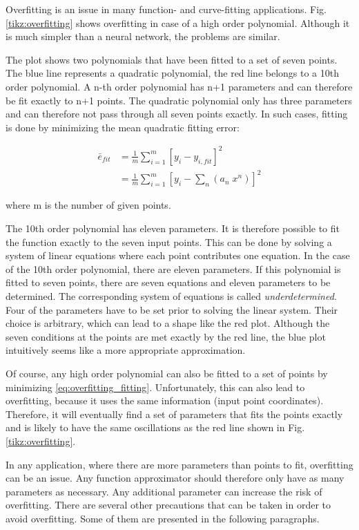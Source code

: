 Overfitting is an issue in many function- and curve-fitting applications. Fig. \ref{tikz:overfitting} shows overfitting in case of a high order polynomial. Although it is much simpler than a neural network, the problems are similar.

The plot shows two polynomials that have been fitted to a set of seven points. The blue line represents a quadratic polynomial, the red line belongs to a 10th order polynomial. A n-th order polynomial has n+1 parameters and can therefore be fit exactly to n+1 points. The quadratic polynomial only has three parameters and can therefore not pass through all seven points exactly. In such cases, fitting is done by minimizing the mean quadratic fitting error: 

\begin{align}
\bar{e}_{fit}&=\frac{1}{m}\sum_{i=1}^{m}[y_i-y_{i,fit}]^2 \\
&=\frac{1}{m}\sum_{i=1}^{m}[y_i-\sum_n (a_n\;x^n)]^2
\label{eq:overfitting_fitting}
\end{align}

where m is the number of given points. 

The 10th order polynomial has eleven parameters. It is therefore possible to fit the function exactly to the seven input points. This can be done by solving a system of linear equations where each point contributes one equation. In the case of the 10th order polynomial, there are eleven parameters. If this polynomial is fitted to seven points, there are seven equations and eleven parameters to be determined. The corresponding system of equations is called \textit{underdetermined}. Four of the parameters have to be set prior to solving the linear system. Their choice is arbitrary, which can lead to a shape like the red plot. Although the seven conditions at the points are met exactly by the red line, the blue plot intuitively seems like a more appropriate approximation.

Of course, any high order polynomial can also be fitted to a set of points by minimizing \ref{eq:overfitting_fitting}. Unfortunately, this can also lead to overfitting, because it uses the same information (input point coordinates). Therefore, it will eventually find a set of parameters that fits the points exactly and is likely to have the same oscillations as the red line shown in Fig. \ref{tikz:overfitting}.

In any application, where there are more parameters than points to fit, overfitting can be an issue. Any function approximator should therefore only have as many parameters as necessary. Any additional parameter can increase the risk of overfitting. There are several other precautions that can be taken in order to avoid overfitting. Some of them are presented in the following paragraphs. \bigbreak

